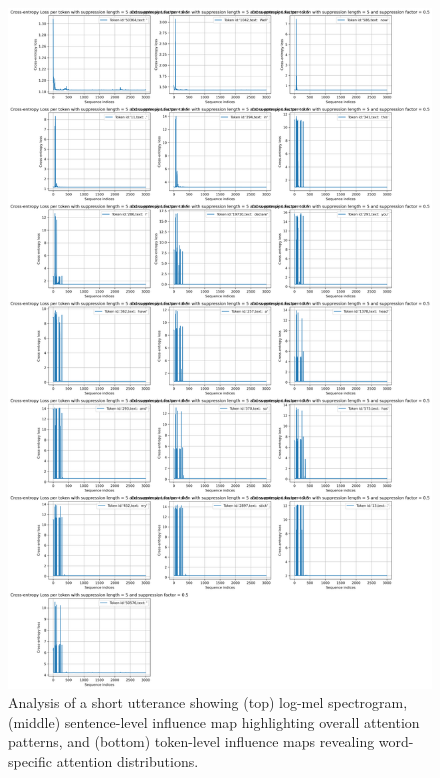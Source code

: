 \documentclass[../report.tex]{subfiles}
\begin{document}
\begin{figure}[p]
        \includegraphics[width=\textwidth,height=0.45\textheight]{figures/loss_diff_sentence_1_word.png}
        \caption{Analysis of a short utterance showing (top) log-mel spectrogram, (middle) sentence-level influence map highlighting overall attention patterns, and (bottom) token-level influence maps revealing word-specific attention distributions.}
        \label{fig:viz_set1}
    \end{figure}
\end{document}
